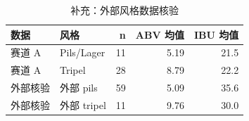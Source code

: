 \begin{table}[tbp]
\centering
\caption{补充：外部风格数据核验}
\label{tab:s08_external}
\footnotesize
\setlength{\tabcolsep}{3.5pt}
\begin{tabular}{llrrr}
\toprule
数据 & 风格 & n & ABV 均值 & IBU 均值 \\
\midrule
赛道 A & Pils/Lager & 11 & 5.19 & 21.5 \\
赛道 A & Tripel & 28 & 8.79 & 22.2 \\
外部核验 & 外部 pils & 59 & 5.09 & 35.6 \\
外部核验 & 外部 tripel & 11 & 9.76 & 30.0 \\
\bottomrule
\end{tabular}
\end{table}
